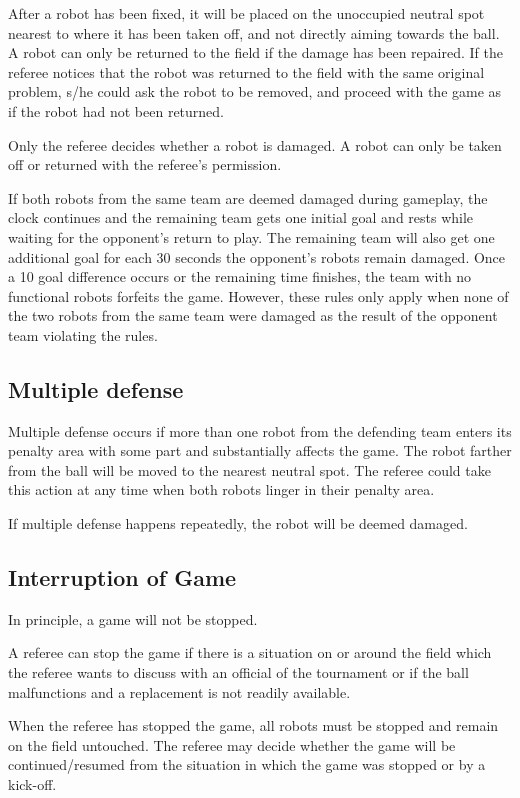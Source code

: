 \documentclass{article}
\begin{document}
After a robot has been fixed, it will be placed on the unoccupied neutral spot nearest to where it has been taken off, and not directly aiming towards the ball. A robot can only be returned to the field if the damage has been repaired. If the referee notices that the robot was returned to the field with the same original problem, s/he could ask the robot to be removed, and proceed with the game as if the robot had not been returned.

Only the referee decides whether a robot is damaged. A robot can only be taken off or returned with the referee's permission.

If both robots from the same team are deemed damaged during gameplay, the clock continues and the remaining team gets one initial goal and rests while waiting for the opponent's return to play. The remaining team will also get one additional goal for each 30 seconds the opponent's robots remain damaged. Once a 10 goal difference occurs or the remaining time finishes, the team with no functional robots forfeits the game. However, these rules only apply when none of the two robots from the same team were damaged as the result of the opponent team violating the rules.

\subsection{Multiple defense \label{ref-013}}

Multiple defense occurs if more than one robot from the defending team enters its penalty area with some part and substantially affects the game. The robot farther from the ball will be moved to the nearest neutral spot. The referee could take this action at any time when both robots linger in their penalty area.

If multiple defense happens repeatedly, the robot will be deemed damaged.

\subsection{ Interruption of Game \label{ref-014}}

In principle, a game will not be stopped.

A referee can stop the game if there is a situation on or around the field which the referee wants to discuss with an official of the tournament or if the ball malfunctions and a replacement is not readily available.

When the referee has stopped the game, all robots must be stopped and remain on the field untouched. The referee may decide whether the game will be continued/resumed from the situation in which the game was stopped or by a kick-off.
\end{document}
